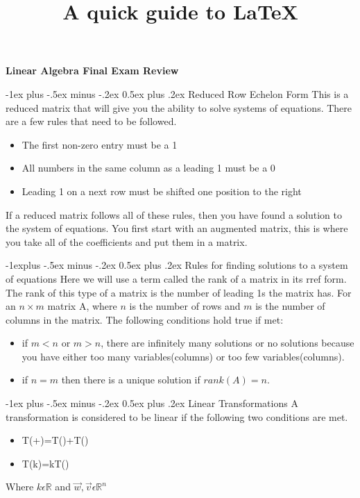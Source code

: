 \documentclass[10pt,landscape]{article}
\title{A quick guide to LaTeX}
\makeatletter
\renewcommand{\section}{\@startsection{section}{1}{0mm}%
                                {-1ex plus -.5ex minus -.2ex}%
                                {0.5ex plus .2ex}%
                                {\normalfont\large\bfseries}}
\renewcommand{\subsection}{\@startsection{subsection}{2}{0mm}%
                                {-1explus -.5ex minus -.2ex}%
                                {0.5ex plus .2ex}%
                                {\normalfont\normalsize\bfseries}}
\makeatother
\begin{document}
\raggedright
\footnotesize

\begin{center}
     \Large{\textbf{Linear Algebra Final Exam Review}} \\
\end{center}
\begin{multicols}{3}
\setlength{\premulticols}{1pt}
\setlength{\postmulticols}{1pt}
\setlength{\multicolsep}{1pt}
\setlength{\columnsep}{2pt}


\section{Reduced Row Echelon Form}
This is a reduced matrix that will give you the ability to solve systems of equations. There are a few rules that need to be followed.
\begin{itemize}
    \item The first non-zero entry must be a 1
    \item All numbers in the same column as a leading 1 must be a 0
    \item Leading 1 on a next row must be shifted one position to the right
\end{itemize}{}
If a reduced matrix follows all of these rules, then you have found a solution to the system of equations. You first start with an augmented matrix, this is where you take all of the coefficients and put them in a matrix.

\subsection{Rules for finding solutions to a system of equations}
Here we will use a term called the rank of a matrix in its rref form. The rank of this type of a matrix is the number of leading 1s the matrix has. For an $n \times m$ matrix A, where $n$ is the number of rows and $m$ is the number of columns in the matrix. The following conditions hold true if met:
\begin{itemize}
    \item if $m<n$ or $m>n$, there are infinitely many solutions or no solutions because you have either too many variables(columns) or too few variables(columns).
    \item if $n=m$ then there is a unique solution if $rank(A)=n$.
\end{itemize}{}

\section{Linear Transformations}
A transformation is considered to be linear if the following two conditions are met. 
\begin{itemize}
    \item T(+)=T()+T()
    \item T(k)=kT()
\end{itemize}{}
Where $k\epsilon \mathbb{R}$ and $\Vec{w},\Vec{v} \epsilon \mathbb{R}^n$



\end{multicols}
\end{document}
